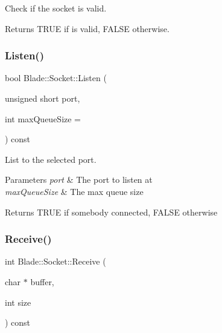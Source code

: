 Check if the socket is valid. 

\begin{DoxyReturn}{Returns}
T\+R\+UE if is valid, F\+A\+L\+SE otherwise. 
\end{DoxyReturn}
\mbox{\label{class_blade_1_1_socket_a801888c94b0ba8cc2ca912a72ee50a1b}} 
\subsubsection{\texorpdfstring{Listen()}{Listen()}}
{\footnotesize\ttfamily bool Blade\+::\+Socket\+::\+Listen (\begin{DoxyParamCaption}\item[{unsigned short}]{port,  }\item[{int}]{max\+Queue\+Size = {} }\end{DoxyParamCaption}) const\hspace{0.3cm}{\ttfamily [noexcept]}}



List to the selected port. 


\begin{DoxyParams}{Parameters}
{\em port} & The port to listen at \\
\hline
{\em max\+Queue\+Size} & The max queue size \\
\hline
\end{DoxyParams}
\begin{DoxyReturn}{Returns}
T\+R\+UE if somebody connected, F\+A\+L\+SE otherwise 
\end{DoxyReturn}
\mbox{\label{class_blade_1_1_socket_ab6e77d46652d77508f6fdd1c5d3161ba}} 
\subsubsection{\texorpdfstring{Receive()}{Receive()}}
{\footnotesize\ttfamily int Blade\+::\+Socket\+::\+Receive (\begin{DoxyParamCaption}\item[{char $\ast$}]{buffer,  }\item[{int}]{size }\end{DoxyParamCaption}) const\hspace{0.3cm}{\ttfamily [noexcept]}}



